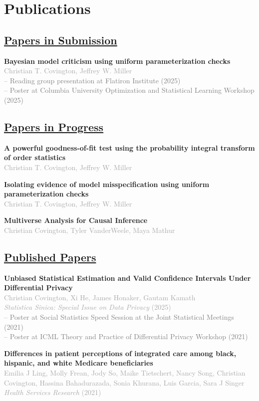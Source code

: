 \documentclass[11pt,a4paper]{article}
\newcommand{\cvpub}[2]{
    \vspace{4pt}
    \noindent\textbf{#1} \\
    \textcolor{darkgray}{#2} \vspace{2pt}
}
\newcommand{\cvpres}[1]{
 \vspace{-6pt}
 \textcolor{gray}{\small \quad -- #1} \vspace{6pt}
}
\begin{document}
\section{Publications}

\subsection{\underline{Papers in Submission}}
\cvpub{Bayesian model criticism using uniform parameterization checks}
      {Christian T. Covington, Jeffrey W. Miller} \\
\cvpres{Reading group presentation at Flatiron Institute (2025)} \\
\cvpres{Poster at Columbia University Optimization and Statistical Learning Workshop (2025)}

\subsection{\underline{Papers in Progress}}
\cvpub{A powerful goodness-of-fit test using the probability integral transform of order statistics}
      {Christian T. Covington, Jeffrey W. Miller}

\cvpub{Isolating evidence of model misspecification using uniform parameterization checks}
      {Christian T. Covington, Jeffrey W. Miller}

\cvpub{Multiverse Analysis for Causal Inference}
      {Christian Covington, Tyler VanderWeele, Maya Mathur}

\subsection{\underline{Published Papers}}
\cvpub{Unbiased Statistical Estimation and Valid Confidence Intervals Under Differential Privacy}
      {Christian Covington, Xi He, James Honaker, Gautam Kamath \\ 
       \textit{Statistica Sinica: Special Issue on Data Privacy} (2025)} \\
\cvpres{Poster at Social Statistics Speed Session at the Joint Statistical Meetings (2021)} \\
\cvpres{Poster at ICML Theory and Practice of Differential Privacy Workshop (2021)}

\cvpub{Differences in patient perceptions of integrated care among black, hispanic, and white Medicare beneficiaries}
      {Emilia J Ling, Molly Frean, Jody So, Maike Tietschert, Nancy Song, Christian Covington, Hassina Bahadurazada, Sonia Khurana, Luis Garcia, Sara J Singer \\ 
      \textit{Health Services Research} (2021)}
\end{document}
